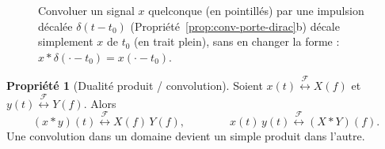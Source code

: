 \documentclass[a4paper,11pt]{article}
\theoremstyle{definition}
\newtheorem{proposition}{Propriété}[section]
\newcommand{\tf}{\overset{\mathcal F}{\longleftrightarrow}}
\begin{document}
\begin{figure}[h]
    \centering
    \caption{Convoluer un signal $x$ quelconque (en pointillés) par une impulsion décalée $\delta(t-t_0)$ (Propriété~\ref{prop:conv-porte-dirac}b) décale simplement $x$ de $t_0$ (en trait plein), sans en changer la forme : $x*\delta(\cdot-t_0)=x(\cdot-t_0)$.}
\end{figure}

\begin{proposition}[Dualité produit / convolution]
    \label{prop:conv-tf-dualite}
    Soient $x(t)\tf X(f)$ et $y(t)\tf Y(f)$. Alors
    $$
        (x*y)(t) \tf X(f)\,Y(f), \qquad\qquad x(t)\,y(t) \tf (X*Y)(f).
    $$
    Une convolution dans un domaine devient un simple produit dans l'autre.
\end{proposition}
\end{document}
